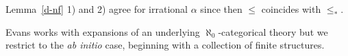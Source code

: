 \documentclass[11pt]{amsart}
\def\bK{{\bf K}}
\def\icl{\mathop{\rm icl}}
\newcommand{\sidebar}[1]{\vskip10pt\noindent
 \hskip.70truein\vrule width2.0pt\hskip.5em
 \vbox{\hsize= 4truein\noindent\footnotesize\relax #1 }\vskip10pt\noindent}
\DeclareMathOperator{\acl}{acl}
\def\cl{\operatorname{cl}}
\newtheorem{fact}[theorem]{Fact}
\theoremstyle{definition}
\theoremstyle{remark}
\def\Ind{\setbox0=\hbox{$x$}\kern\wd0\hbox to 0pt{\hss$\mid$\hss} \lower.9\ht0\hbox to 0pt{\hss$\smile$\hss}\kern\wd0}
\numberwithin{equation}{section}
\begin{document}
Lemma~\ref{d-nf} 1) and 2) agree for irrational $\alpha$ since then $\leq$ coincides with $\leq_{*}$.




Evans works with expansions of an underlying $\aleph_0$-categorical theory
but we restrict to the {\em ab initio} case, beginning with a collection of
finite structures.

%
%
%
%
%
%
%




%








%
%
%
\end{document}
